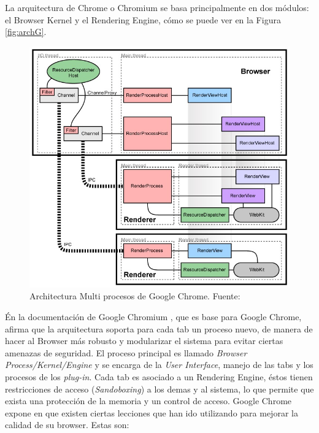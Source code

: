     La arquitectura de Chrome o Chromium se basa principalmente en dos módulos: el Browser Kernel y el Rendering Engine, cómo se puede ver en la Figura \ref{fig:archG}.

    \begin{figure}[h!t]
        \centering
        \includegraphics[scale=0.5]{figures/archGC.jpg}
        \caption{Architectura Multi procesos de Google Chrome. Fuente: \cite{multiProcGC}}
        \label{fig:archGC}
    \end{figure}

    Én la documentación de Google Chromium \cite{multiProcGC}, que es base para Google Chrome, afirma que la arquitectura soporta para cada tab un proceso nuevo, de manera de hacer al Browser más robusto y modularizar el sistema para evitar ciertas amenazas de seguridad. El proceso principal es llamado \textit{Browser Process/Kernel/Engine} y se encarga de la \textit{User Interface}, manejo de las tabs y los procesos de los \textit{plug-in}. Cada tab es asociado a un Rendering Engine, éstos tienen restricciones de acceso (\textit{Sandoboxing}) a los demas y al sistema, lo que permite que exista una protección de la memoria y un control de acceso. Google Chrome expone en \cite{reis2009browser} que existen ciertas lecciones que han ido utilizando para mejorar la calidad de su browser. Estas son:


